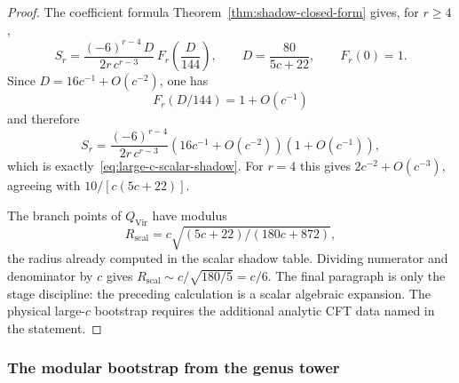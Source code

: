 \begin{proof}
The coefficient formula
Theorem~\ref{thm:shadow-closed-form} gives, for \(r\ge4\),
\[
S_r
=
\frac{(-6)^{r-4}\,D}{2r\,c^{r-3}}\,
F_r\!\left(\frac{D}{144}\right),
\qquad
D=\frac{80}{5c+22},
\qquad
F_r(0)=1 .
\]
Since \(D=16c^{-1}+O(c^{-2})\), one has
\[
F_r(D/144)=1+O(c^{-1})
\]
and therefore
\[
S_r=
\frac{(-6)^{r-4}}{2r\,c^{r-3}}
\left(16c^{-1}+O(c^{-2})\right)
\left(1+O(c^{-1})\right),
\]
which is exactly~\eqref{eq:large-c-scalar-shadow}.  For \(r=4\)
this gives \(2c^{-2}+O(c^{-3})\), agreeing with
\(10/[c(5c+22)]\).

The branch points of \(Q_{\mathrm{Vir}}\) have modulus
\[
R_{\mathrm{scal}}
=c\sqrt{(5c+22)/(180c+872)} ,
\]
the radius already computed in the scalar shadow table.  Dividing
numerator and denominator by \(c\) gives
\(R_{\mathrm{scal}}\sim c/\sqrt{180/5}=c/6\).
The final paragraph is only the stage discipline: the preceding
calculation is a scalar algebraic expansion.  The physical large-\(c\)
bootstrap requires the additional analytic CFT data named in the
statement.
\end{proof}

\subsubsection*{The modular bootstrap from the genus tower}

